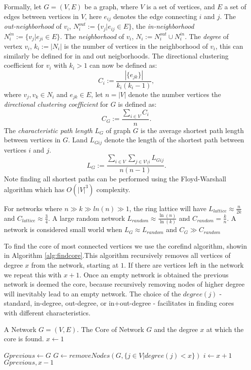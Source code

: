 Formally, let $G=(V, E)$ be a graph, where $V$ is a set of vertices, and $E$ a set of edges between vertices in $V$, here $e_{ij}$ denotes the edge connecting $i$ and $j$.  The \textit{out-neighborhood} of $v_i$, $N_i^{out}:=\{v_j|e_{ij}\in E\}$, the \textit{in-neighborhood} $N_i^{in}:=\{v_j|e_{ji}\in E\}$. The \textit{neighborhood} of $v_i$, $N_i:=N_i^{out}\cup N_i^{in}$. The \textit{degree} of vertex $v_i$, $k_i:=|N_i|$ is the number of vertices in the neighborhood of $v_i$, this can similarly be defined for in and out neigborhoods. The directional clustering coefficient for $v_i$ with $k_i>1$ can now be defined as:
$$C_i :=\frac{|\{e_{jk}\}|}{k_i(k_i-1)},$$
where $v_j,v_k\in N_i$ and $e_{jk}\in E$, let $n=|V|$ denote the number vertices the \textit{directional clustering coefficient} for $G$ is defined as:
$$C_G:=\frac{\sum_{i\in V} C_i}{n}.$$
The \textit{characteristic path length} $L_G$ of graph $G$ is the average shortest path length between vertices in $G$. Land  $L_{Gij}$ denote the length of the shortest path between vertices $i$ and $j$. 
$$L_G:= \frac{\sum_{i\in V} \sum_{j \in V\setminus i}L_{Gij}}{n(n-1)}.$$ 
Note finding all shortest paths can be performed using the Floyd-Warshall algorithm which has $O(|V|^3)$ complexity\cite{Floyd}.

For networks where $n\gg k\gg ln(n) \gg1$, the ring lattice will have $L_{lattice}\approx\frac{n}{2k}$ and $C_{lattice}\approx\frac{3}{4}$.
A large random network  $ L_{random}\approx\frac{\ln(n)}{\ln(k)}$ and $C_{random}=\frac{k}{n}$. A network is considered small world when $L_G\approx L_{random}$ and $C_G \gg C_{random}$

To find the core of most connected vertices we use the corefind algorithm, showin in Algorithm \ref{alg:findcore}.This algorithm recursively removes all vertices of degree $x$ from the network, starting at $1$. If there are vertices left in the network we repeat this with $x+1$. Once an empty network is obtained the previous network is deemed the core, because recursively removing nodes of higher degree will inevitably lead to an empty network. The choice of the $degree(j)$ - standard, in-degree, out-degree,  or in+out-degree - facilitates in finding cores with different characteristics.


\newcommand{\FindCore}{\ensuremath{\mbox{\sc FindCore}}}
\begin{algorithm}[h!]
\caption{$\FindCore(Network)$}\label{alg:findcore}
\begin{algorithmic}
\REQUIRE A Network $G=(V,E)$.
\ENSURE The Core of Network $G$ and the degree $x$ at which the core is found.
\medskip
\STATE $x\gets 1$
	
	\STATE $Gprevious \gets G$
		\STATE $G\gets removeNodes(G, \{j\in V | degree(j)<x\})$ 
	\ENDWHILE
	\STATE $i \gets x+1$
\ENDWHILE
\RETURN $Gprevious, x-1$
\end{algorithmic}
\end{algorithm}